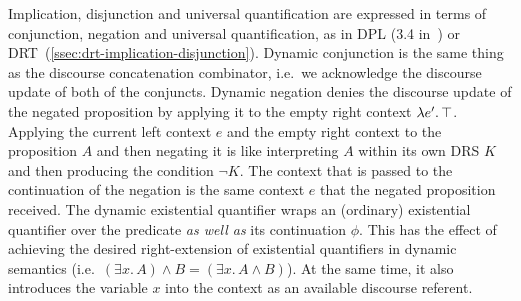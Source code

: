 Implication, disjunction and universal quantification are expressed in
terms of conjunction, negation and universal quantification, as in DPL (3.4
in~\cite{groenendijk1991dynamic}) or
DRT~(\ref{ssec:drt-implication-disjunction}). Dynamic conjunction is the
same thing as the discourse concatenation combinator, i.e.\ we acknowledge
the discourse update of both of the conjuncts. Dynamic negation denies the
discourse update of the negated proposition by applying it to the empty
right context $\lambda e'.\, \top$. Applying the current left context $e$ and
the empty right context to the proposition $A$ and then negating it is like
interpreting $A$ within its own DRS $K$ and then producing the condition
$\lnot K$. The context that is passed to the continuation of the negation
is the same context $e$ that the negated proposition received. The dynamic
existential quantifier wraps an (ordinary) existential quantifier over the
predicate \emph{as well as} its continuation $\phi$. This has the effect of
achieving the desired right-extension of existential quantifiers in dynamic
semantics (i.e.\ $(\exists x.\, A) \land B = (\exists x.\, A \land B)$). At
the same time, it also introduces the variable $x$ into the context as an
available discourse referent.

